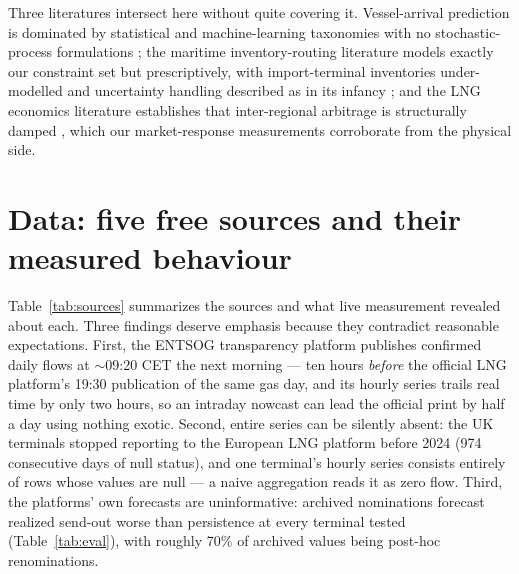 \documentclass[11pt]{article}
\begin{document}
Three literatures intersect here without quite covering it. Vessel-arrival
prediction is dominated by statistical and machine-learning taxonomies
with no stochastic-process formulations \cite{eta_review}; the maritime
inventory-routing literature models exactly our constraint set but
prescriptively, with import-terminal inventories under-modelled and
uncertainty handling described as in its infancy \cite{mirp}; and the LNG
economics literature establishes that inter-regional arbitrage is
structurally damped \cite{arbitrage2014,realoption2020}, which our
market-response measurements corroborate from the physical side.

\section{Data: five free sources and their measured behaviour}
\label{sec:data}
Table~\ref{tab:sources} summarizes the sources and what live measurement
revealed about each. Three findings deserve emphasis because they
contradict reasonable expectations. First, the ENTSOG transparency
platform publishes confirmed daily flows at $\sim$09:20 CET the next
morning --- ten hours \emph{before} the official LNG platform's 19:30
publication of the same gas day, and its hourly series trails real time by
only two hours, so an intraday nowcast can lead the official print by half
a day using nothing exotic. Second, entire series can be silently absent:
the UK terminals stopped reporting to the European LNG platform before
2024 (974 consecutive days of null status), and one terminal's hourly
series consists entirely of rows whose values are null --- a naive
aggregation reads it as zero flow. Third, the platforms' own forecasts are
uninformative: archived nominations forecast realized send-out worse than
persistence at every terminal tested (Table~\ref{tab:eval}), with roughly
70\% of archived values being post-hoc renominations.
\end{document}
